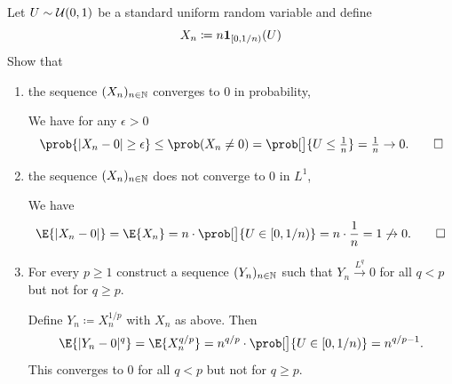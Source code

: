 \begin{exercise}
    \label{ex: convergence in probability but not in Lp}
    Let \(U\sim \mathcal{U}(0,1)\) be a standard uniform random variable and define
    \[
        X_n \coloneq n \ind{[0, 1/n)}(U)
    \]
    Show that
    \begin{enumerate}[label=(\alph*), noitemsep]
        \item the sequence \((X_n)_{n\in \mathbb{N}}\) converges to \(0\) in probability,
        \begin{solution}
            We have for any \(\epsilon > 0\)
            \[
                \prob{|X_n - 0| \ge \epsilon}
                \le \prob(X_n \neq 0)
                = \prob[\big]{U\le \tfrac1n}
                = \tfrac1n
                \to 0.
                \qedhere
            \]
        \end{solution}

        \item the sequence \((X_n)_{n\in \mathbb{N}}\) does not converge to \(0\) in \(L^1\),
        \begin{solution}
            We have
            \[
                \E{|X_n - 0|}
                = \E{X_n}
                = n \cdot \prob[\big]{U \in [0, 1/n)}
                = n \cdot \frac1n
                = 1 \not\to 0.
                \qedhere
            \]            
        \end{solution}

        \item For every \(p \ge 1\) construct a sequence \((Y_n)_{n\in \mathbb{N}}\) such that
        \(Y_n\xrightarrow{L^q} 0\) for all \(q < p\) but not for \(q \ge p\).
        \begin{solution}
            Define \(Y_n \coloneq X_n^{1/p}\) with \(X_n\) as above. Then
            \[
                \E{|Y_n - 0|^q} = \E{X_n^{q/p}} = n^{q/p} \cdot \prob[\big]{U \in [0, 1/n)} = n^{q/p - 1}.
            \]
            This converges to \(0\) for all \(q < p\) but not for \(q \ge p\).
        \end{solution}
        \end{enumerate}
\end{exercise}

